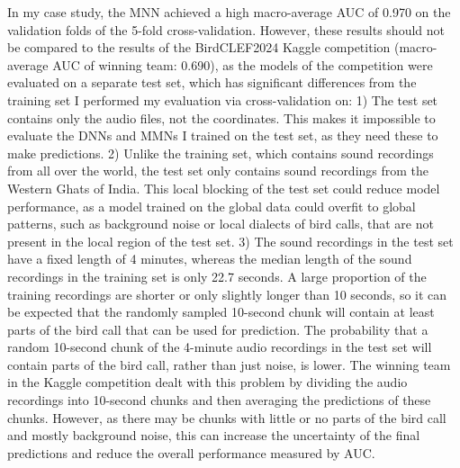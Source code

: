 \documentclass[12pt,twoside]{scrreport}
\begin{document}
In my case study, the MNN achieved a high macro-average AUC of 0.970 on the validation folds of the 5-fold cross-validation. However, these results should not be compared to the results of the BirdCLEF2024 Kaggle competition (macro-average AUC of winning team: 0.690), as the models of the competition were evaluated on a separate test set, which has significant differences from the training set I performed my evaluation via cross-validation on: 1) The test set contains only the audio files, not the coordinates. This makes it impossible to evaluate the DNNs and MMNs I trained on the test set, as they need these to make predictions. 2) Unlike the training set, which contains sound recordings from all over the world, the test set only contains sound recordings from the Western Ghats of India. This local blocking of the test set could reduce model performance, as a model trained on the global data could overfit to global patterns, such as background noise or local dialects of bird calls, that are not present in the local region of the test set. 3) The sound recordings in the test set have a fixed length of 4 minutes, whereas the median length of the sound recordings in the training set is only 22.7 seconds. A large proportion of the training recordings are shorter or only slightly longer than 10 seconds, so it can be expected that the randomly sampled 10-second chunk will contain at least parts of the bird call that can be used for prediction. The probability that a random 10-second chunk of the 4-minute audio recordings in the test set will contain parts of the bird call, rather than just noise, is lower. The winning team in the Kaggle competition dealt with this problem by dividing the audio recordings into 10-second chunks and then averaging the predictions of these chunks. However, as there may be chunks with little or no parts of the bird call and mostly background noise, this can increase the uncertainty of the final predictions and reduce the overall performance measured by AUC. 
\end{document}
